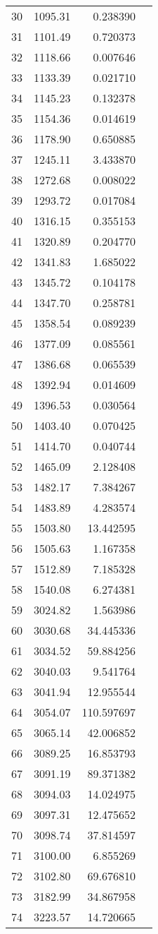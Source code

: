 \begin{tabular}{r|rr|l}
30 &  1095.31 &   0.238390  & \\
31 &  1101.49 &   0.720373  & \\
32 &  1118.66 &   0.007646  & \\
33 &  1133.39 &   0.021710  & \\
34 &  1145.23 &   0.132378  & \\
35 &  1154.36 &   0.014619  & \\
36 &  1178.90 &   0.650885  & \\
37 &  1245.11 &   3.433870  & \\
38 &  1272.68 &   0.008022  & \\
39 &  1293.72 &   0.017084  & \\
40 &  1316.15 &   0.355153  & \\
41 &  1320.89 &   0.204770  & \\
42 &  1341.83 &   1.685022  & \\
43 &  1345.72 &   0.104178  & \\
44 &  1347.70 &   0.258781  & \\
45 &  1358.54 &   0.089239  & \\
46 &  1377.09 &   0.085561  & \\
47 &  1386.68 &   0.065539  & \\
48 &  1392.94 &   0.014609  & \\
49 &  1396.53 &   0.030564  & \\
50 &  1403.40 &   0.070425  & \\
51 &  1414.70 &   0.040744  & \\
52 &  1465.09 &   2.128408  & \\
53 &  1482.17 &   7.384267  & \\
54 &  1483.89 &   4.283574  & \\
55 &  1503.80 &  13.442595  & \\
56 &  1505.63 &   1.167358  & \\
57 &  1512.89 &   7.185328  & \\
58 &  1540.08 &   6.274381  & \\
59 &  3024.82 &   1.563986  & \\
60 &  3030.68 &  34.445336  & \\
61 &  3034.52 &  59.884256  & \\
62 &  3040.03 &   9.541764  & \\
63 &  3041.94 &  12.955544  & \\
64 &  3054.07 & 110.597697  & \\
65 &  3065.14 &  42.006852  & \\
66 &  3089.25 &  16.853793  & \\
67 &  3091.19 &  89.371382  & \\
68 &  3094.03 &  14.024975  & \\
69 &  3097.31 &  12.475652  & \\
70 &  3098.74 &  37.814597  & \\
71 &  3100.00 &   6.855269  & \\
72 &  3102.80 &  69.676810  & \\
73 &  3182.99 &  34.867958  & \\
74 &  3223.57 &  14.720665  & \\
  \bottomrule
  \end{tabular}
